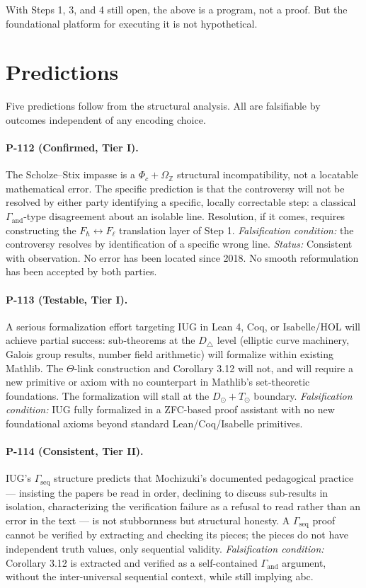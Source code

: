 \documentclass[12pt]{article}
\theoremstyle{plain}
\theoremstyle{definition}
\theoremstyle{remark}
\newcommand{\bZ}{\mathbb{Z}}
\begin{document}
With Steps 1, 3, and 4 still open, the above is a program, not a proof. But the foundational
platform for executing it is not hypothetical.

\section{Predictions}
\label{sec:predictions}

Five predictions follow from the structural analysis. All are falsifiable by outcomes
independent of any encoding choice.

\paragraph{P-112 (Confirmed, Tier I).}
The Scholze--Stix impasse is a $\Phi_c + \Omega_\bZ$ structural incompatibility, not a
locatable mathematical error. The specific prediction is that the controversy will not be
resolved by either party identifying a specific, locally correctable step: a classical
$\Gamma_\text{and}$-type disagreement about an isolable line. Resolution, if it comes,
requires constructing the $F_\hbar \leftrightarrow F_\ell$ translation layer of Step 1.
\textit{Falsification condition:} the controversy resolves by identification of a specific
wrong line. \textit{Status:} Consistent with observation. No error has been located since 2018.
No smooth reformulation has been accepted by both parties.

\paragraph{P-113 (Testable, Tier I).}
A serious formalization effort targeting IUG in Lean 4, Coq, or Isabelle/HOL will achieve
partial success: sub-theorems at the $D_\triangle$ level (elliptic curve machinery, Galois
group results, number field arithmetic) will formalize within existing Mathlib. The
$\Theta$-link construction and Corollary 3.12 will not, and will require a new primitive or
axiom with no counterpart in Mathlib's set-theoretic foundations. The formalization will
stall at the $D_\odot + T_\odot$ boundary.
\textit{Falsification condition:} IUG fully formalized in a ZFC-based proof assistant with
no new foundational axioms beyond standard Lean/Coq/Isabelle primitives.

\paragraph{P-114 (Consistent, Tier II).}
IUG's $\Gamma_\text{seq}$ structure predicts that Mochizuki's documented pedagogical
practice --- insisting the papers be read in order, declining to discuss sub-results in
isolation, characterizing the verification failure as a refusal to read rather than an error
in the text --- is not stubbornness but structural honesty. A $\Gamma_\text{seq}$ proof cannot
be verified by extracting and checking its pieces; the pieces do not have independent truth
values, only sequential validity.
\textit{Falsification condition:} Corollary 3.12 is extracted and verified as a self-contained
$\Gamma_\text{and}$ argument, without the inter-universal sequential context, while still
implying abc.
\end{document}
